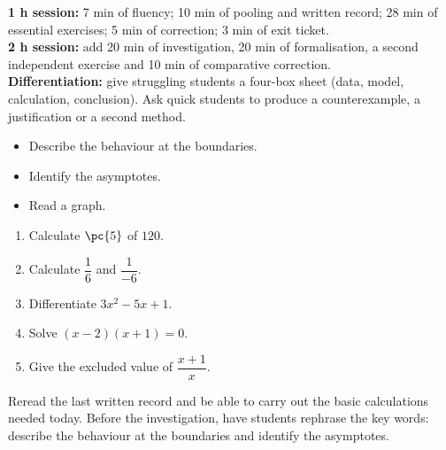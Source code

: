 \ifmxteacher
\begin{method}
\textbf{1 h session:} 7 min of fluency; 10 min of pooling and written record; 28 min of essential exercises; 5 min of correction; 3 min of exit ticket.\\
\textbf{2 h session:} add 20 min of investigation, 20 min of formalisation, a second independent exercise and 10 min of comparative correction.\\
\textbf{Differentiation:} give struggling students a four-box sheet (data, model, calculation, conclusion). Ask quick students to produce a counterexample, a justification or a second method.
\end{method}
\fi
{}
\begin{objectives}\begin{itemize}\item Describe the behaviour at the boundaries.\item Identify the asymptotes.\item Read a graph.\end{itemize}\end{objectives}
\begin{fluency}\begin{enumerate}\item Calculate $\pc{5}$ of $120$. \item Calculate $\dfrac1{6}$ and $\dfrac1{-6}$. \item Differentiate $3x^2-5x+1$. \item Solve $(x-2)(x+1)=0$. \item Give the excluded value of $\dfrac{x+1}{x}$. \end{enumerate}\end{fluency}
\begin{prerequisites}Reread the last written record and be able to carry out the basic calculations needed today. Before the investigation, have students rephrase the key words: describe the behaviour at the boundaries and identify the asymptotes.\end{prerequisites}

